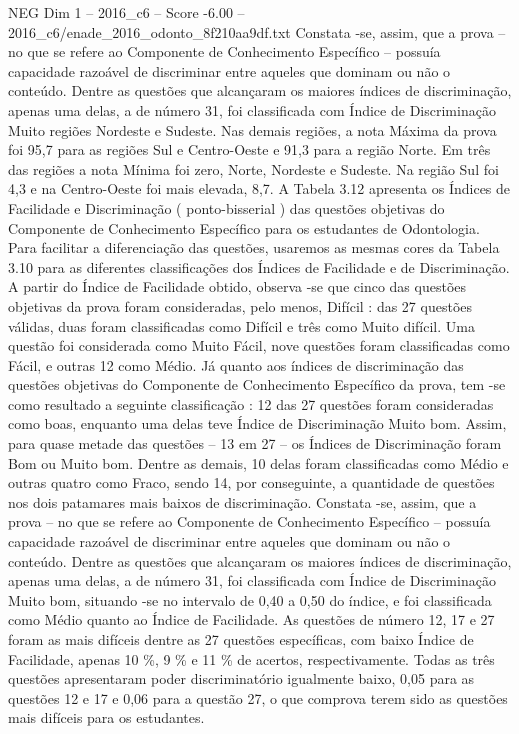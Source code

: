 \begin{textsample}{NEG Dim 1 – 2016\_c6 – Score -6.00 – 2016\_c6/enade\_2016\_odonto\_8f210aa9df.txt}
Constata -se, assim, que a prova – no que se refere ao Componente de Conhecimento Específico – possuía capacidade razoável de discriminar entre aqueles que dominam ou não o conteúdo.
Dentre as questões que alcançaram os maiores índices de discriminação, apenas uma delas, a de número 31, foi classificada com Índice de Discriminação Muito regiões Nordeste e Sudeste.
Nas demais regiões, a nota Máxima da prova foi 95,7 para as regiões Sul e Centro-Oeste e 91,3 para a região Norte.
Em três das regiões a nota Mínima foi zero, Norte, Nordeste e Sudeste.
Na região Sul foi 4,3 e na Centro-Oeste foi mais elevada, 8,7.
A Tabela 3.12 apresenta os Índices de Facilidade e Discriminação ( ponto-bisserial ) das questões objetivas do Componente de Conhecimento Específico para os estudantes de Odontologia.
Para facilitar a diferenciação das questões, usaremos as mesmas cores da Tabela 3.10 para as diferentes classificações dos Índices de Facilidade e de Discriminação.
A partir do Índice de Facilidade obtido, observa -se que cinco das questões objetivas da prova foram consideradas, pelo menos, Difícil : das 27 questões válidas, duas foram classificadas como Difícil e três como Muito difícil.
Uma questão foi considerada como Muito Fácil, nove questões foram classificadas como Fácil, e outras 12 como Médio.
Já quanto aos índices de discriminação das questões objetivas do Componente de Conhecimento Específico da prova, tem -se como resultado a seguinte classificação : 12 das 27 questões foram consideradas como boas, enquanto uma delas teve Índice de Discriminação Muito bom.
Assim, para quase metade das questões – 13 em 27 – os Índices de Discriminação foram Bom ou Muito bom.
Dentre as demais, 10 delas foram classificadas como Médio e outras quatro como Fraco, sendo 14, por conseguinte, a quantidade de questões nos dois patamares mais baixos de discriminação.
Constata -se, assim, que a prova – no que se refere ao Componente de Conhecimento Específico – possuía capacidade razoável de discriminar entre aqueles que dominam ou não o conteúdo.
Dentre as questões que alcançaram os maiores índices de discriminação, apenas uma delas, a de número 31, foi classificada com Índice de Discriminação Muito bom, situando -se no intervalo de 0,40 a 0,50 do índice, e foi classificada como Médio quanto ao Índice de Facilidade.
As questões de número 12, 17 e 27 foram as mais difíceis dentre as 27 questões específicas, com baixo Índice de Facilidade, apenas 10 \%, 9 \% e 11 \% de acertos, respectivamente.
Todas as três questões apresentaram poder discriminatório igualmente baixo, 0,05 para as questões 12 e 17 e 0,06 para a questão 27, o que comprova terem sido as questões mais difíceis para os estudantes.

\end{textsample}
